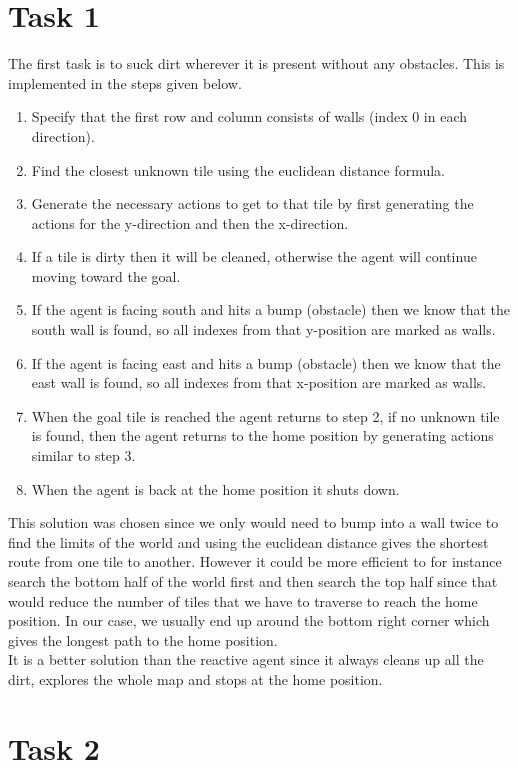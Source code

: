 \documentclass[a4paper,10pt]{article}
\begin{document}
\section{Task 1}

The first task is to suck dirt wherever it is present without any obstacles. 
This is implemented in the steps given below.
\begin{enumerate}
	\item Specify that the first row and column consists of walls (index 0 in each direction).
	\item Find the closest unknown tile using the euclidean distance formula.
	\item Generate the necessary actions to get to that tile by first generating the actions for the y-direction and then the x-direction.
	\item If a tile is dirty then it will be cleaned, otherwise the agent will continue moving toward the goal.
	\item If the agent is facing south and hits a bump (obstacle) then we know that the south wall is found, so all indexes from that y-position are marked as walls.
	\item If the agent is facing east and hits a bump (obstacle) then we know that the east wall is found, so all indexes from that x-position are marked as walls.
	\item When the goal tile is reached the agent returns to step 2, if no unknown tile is found, then the agent returns to the home position by generating actions similar to step 3.
	\item When the agent is back at the home position it shuts down.
\end{enumerate}
This solution was chosen since we only would need to bump into a wall twice to find the limits of the world and using the euclidean distance
gives the shortest route from one tile to another.
However it could be more efficient to for instance search the bottom half of the world first and then search the top half since
that would reduce the number of tiles that we have to traverse to reach the home position.
In our case, we usually end up around the bottom right corner which gives the longest path to the home position.
\\
It is a better solution than the reactive agent since it always cleans up all the dirt, explores the whole map and stops at the home position.

\section{Task 2}
\end{document}
